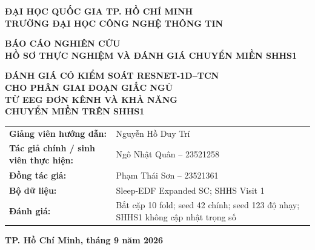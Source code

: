 \begin{titlepage}
\thispagestyle{empty}
\begin{center}
\textbf{\large ĐẠI HỌC QUỐC GIA TP. HỒ CHÍ MINH}\\[0.2cm]
\textbf{\large TRƯỜNG ĐẠI HỌC CÔNG NGHỆ THÔNG TIN}

\vspace{2.2cm}

\textbf{\Large BÁO CÁO NGHIÊN CỨU}\\[0.5cm]
\textbf{\large HỒ SƠ THỰC NGHIỆM VÀ ĐÁNH GIÁ CHUYỂN MIỀN SHHS1}

\vspace{1.5cm}

{\bfseries\LARGE
ĐÁNH GIÁ CÓ KIỂM SOÁT RESNET-1D--TCN\\[0.25cm]
CHO PHÂN GIAI ĐOẠN GIẤC NGỦ\\[0.25cm]
TỪ EEG ĐƠN KÊNH VÀ KHẢ NĂNG\\[0.25cm]
CHUYỂN MIỀN TRÊN SHHS1
}

\vspace{2cm}

\begin{tabular}{>{\bfseries}p{4.2cm}p{7.6cm}}
Giảng viên hướng dẫn: & Nguyễn Hồ Duy Trí \\[0.45cm]
Tác giả chính / sinh viên thực hiện: & Ngô Nhật Quân -- 23521258 \\
Đồng tác giả: & Phạm Thái Sơn -- 23521361 \\[0.45cm]
Bộ dữ liệu: & Sleep-EDF Expanded SC; SHHS Visit 1 \\
Đánh giá: & Bắt cặp 10 fold; seed 42 chính; seed 123 độ nhạy; SHHS1 không cập nhật trọng số \\
\end{tabular}

\vfill

\textbf{TP. Hồ Chí Minh, tháng 9 năm 2026}
\end{center}
\end{titlepage}
